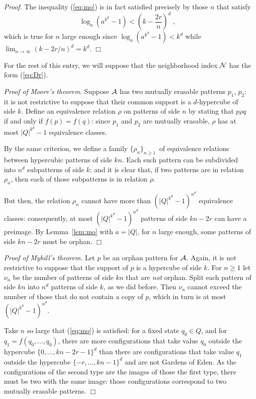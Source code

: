 \documentclass[12pt]{article}
\begin{document}
\textit{Proof.}
The inequality (\ref{eq:mo}) is in fact satisfied
precisely by those $n$ that satisfy
\begin{displaymath}
\log_a (a^{k^d}-1) < \left( k - \frac{2r}{n} \right)^d \;,
\end{displaymath}
which is true for $n$ large enough since
\begin{math}
\log_a (a^{k^d}-1) < k^d
\end{math}
while
\begin{math}
\lim_{n \to \infty} (k - 2r/n)^d = k^d.
\end{math}
\hfill $\Box$

For the rest of this entry, we will suppose
that the neighborhood index $\mathcal{N}$
has the form (\ref{eq:Dr}).

\textit{Proof of Moore's theorem.}
Suppose $\mathcal{A}$ has two mutually erasable patterns $p_1$, $p_2$:
it is not restrictive to suppose that their common support
is a $d$-hypercube of side $k$.
Define an equivalence relation $\rho$ on patterns of side $n$
by stating that $p \rho q$ if and only if $f(p) = f(q)$:
since $p_1$ and $p_2$ are mutually erasable,
$\rho$ has at most $|Q|^{k^d}-1$ equivalence classes.

By the same criterion,
we define a family $\{\rho_n\}_{n \geq 1}$\
of equivalence relations between hypercubic patterns of side $kn$.
Each such pattern can be subdivided
into $n^d$ subpatterns of side $k$:
and it is clear that,
if two patterns are in relation $\rho_n$,
then each of those subpatterns is in relation $\rho$.

But then, the relation $\rho_n$
cannot have more than $(|Q|^{k^d}-1)^{n^d}$ equivalence classes:
consequently, at most $(|Q|^{k^d}-1)^{n^d}$ patterns of side $kn-2r$
can have a preimage.
By Lemma~\ref{lem:mo} with $a=|Q|$,
for $n$ large enough, some patterns of side $kn-2r$ must be orphan.
\hfill $\Box$

\textit{Proof of Myhill's theorem.}
Let $p$ be an orphan pattern for $\mathcal{A}$.
Again, it is not restrictive to suppose
that the support of $p$ is a hypercube of side $k$.
For $n \geq 1$
let $\nu_n$ be the number of patterns of side $kn$
that are \emph{not} orphan.
Split each pattern of side $kn$
into $n^d$ patterns of side $k$, as we did before.
Then $\nu_n$ cannot exceed the number of those
that do not contain a copy of $p$,
which in turn is at most $(|Q|^{k^d}-1)^{n^d}$.

Take $n$ so large that (\ref{eq:mo}) is satisfied:
for a fixed state $q_0 \in Q$, and for $q_1 = f(q_0,\ldots,q_0)$,
there are more configurations that take value $q_0$
outside the hypercube $\{0,\ldots,kn-2r-1\}^d$
than there are configurations that take value $q_1$
outside the hypercube $\{-r,\ldots,kn-1\}^d$
and are not Gardens of Eden.
As the configurations of the second type
are the images of those the first type,
there must be two with the same image:
those configurations correspond to two mutually erasable patterns.
\hfill $\Box$
\end{document}
